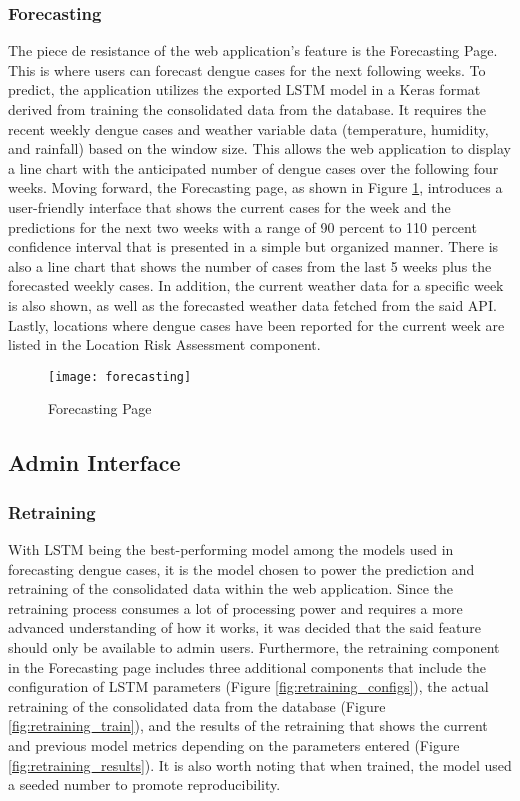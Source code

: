 \subsubsection{Forecasting}

The piece de resistance of the web application's feature is the Forecasting Page. This is where users can forecast dengue cases for the next following weeks. To predict, the application utilizes the exported LSTM model in a Keras format derived from training the consolidated data from the database. It requires the recent weekly dengue cases and weather variable data (temperature, humidity, and rainfall) based on the window size. This allows the web application to display a line chart with the anticipated number of dengue cases over the following four weeks. Moving forward, the Forecasting page, as shown in Figure \ref{fig:forecasting}, introduces a user-friendly interface that shows the current cases for the week and the predictions for the next two weeks with a range of 90 percent to 110 percent confidence interval that is presented in a simple but organized manner. There is also a line chart that shows the number of cases from the last 5 weeks plus the forecasted weekly cases. In addition, the current weather data for a specific week is also shown, as well as the forecasted weather data fetched from the said API. Lastly, locations where dengue cases have been reported for the current week are listed in the Location Risk Assessment component. 

\begin{figure}[H]
	\centering
	\texttt{[image: forecasting]}
	\caption{Forecasting Page}
	\label{fig:forecasting}
\end{figure}

\subsection{Admin Interface}

\subsubsection{Retraining}

With LSTM being the best-performing model among the models used in forecasting dengue cases, it is the model chosen to power the prediction and retraining of the consolidated data within the web application. Since the retraining process consumes a lot of processing power and requires a more advanced understanding of how it works, it was decided that the said feature should only be available to admin users. Furthermore, the retraining component in the Forecasting page includes three additional components that include the configuration of LSTM parameters (Figure \ref{fig:retraining_configs}), the actual retraining of the consolidated data from the database (Figure \ref{fig:retraining_train}), and the results of the retraining that shows the current and previous model metrics depending on the parameters entered (Figure \ref{fig:retraining_results}). It is also worth noting that when trained, the model used a seeded number to promote reproducibility. 


